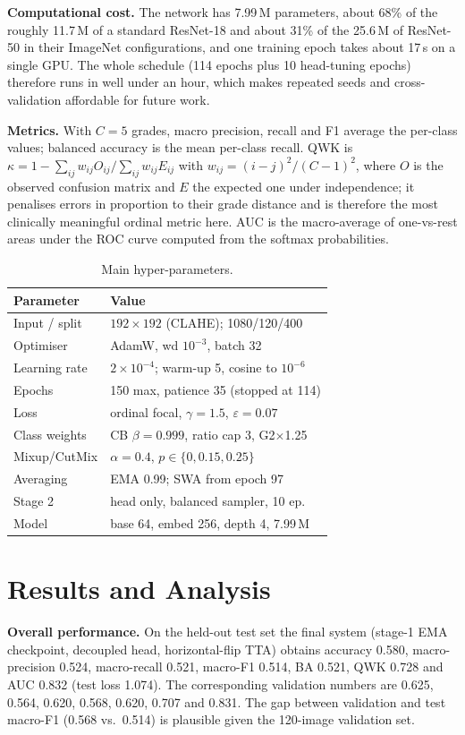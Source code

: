 \documentclass[10pt,twocolumn]{article}
\begin{document}
\textbf{Computational cost.} The network has 7.99\,M parameters, about 68\% of the roughly 11.7\,M of a standard ResNet-18 and about 31\% of the 25.6\,M of ResNet-50 in their ImageNet configurations, and one training epoch takes about 17\,s on a single GPU. The whole schedule (114 epochs plus 10 head-tuning epochs) therefore runs in well under an hour, which makes repeated seeds and cross-validation affordable for future work.

\textbf{Metrics.} With $C{=}5$ grades, macro precision, recall and F1 average the per-class values; balanced accuracy is the mean per-class recall. QWK is $\kappa=1-\sum_{ij}w_{ij}O_{ij}/\sum_{ij}w_{ij}E_{ij}$ with $w_{ij}=(i-j)^2/(C-1)^2$, where $O$ is the observed confusion matrix and $E$ the expected one under independence; it penalises errors in proportion to their grade distance and is therefore the most clinically meaningful ordinal metric here. AUC is the macro-average of one-vs-rest areas under the ROC curve computed from the softmax probabilities.

\begin{table}[t]
\centering\footnotesize
\caption{Main hyper-parameters.}\label{tab:hp}
\begin{tabular}{p{2.55cm}p{4.85cm}}
\toprule
Parameter & Value\\
\midrule
Input / split & $192{\times}192$ (CLAHE); 1080/120/400\\
Optimiser & AdamW, wd $10^{-3}$, batch 32\\
Learning rate & $2{\times}10^{-4}$; warm-up 5, cosine to $10^{-6}$\\
Epochs & 150 max, patience 35 (stopped at 114)\\
Loss & ordinal focal, $\gamma{=}1.5$, $\varepsilon{=}0.07$\\
Class weights & CB $\beta{=}0.999$, ratio cap 3, G2$\times$1.25\\
Mixup/CutMix & $\alpha{=}0.4$, $p\in\{0,0.15,0.25\}$\\
Averaging & EMA 0.99; SWA from epoch 97\\
Stage 2 & head only, balanced sampler, 10 ep.\\
Model & base 64, embed 256, depth 4, 7.99\,M\\
\bottomrule
\end{tabular}
\end{table}

\section{Results and Analysis}
\textbf{Overall performance.} On the held-out test set the final system (stage-1 EMA checkpoint, decoupled head, horizontal-flip TTA) obtains accuracy 0.580, macro-precision 0.524, macro-recall 0.521, macro-F1 0.514, BA 0.521, QWK 0.728 and AUC 0.832 (test loss 1.074). The corresponding validation numbers are 0.625, 0.564, 0.620, 0.568, 0.620, 0.707 and 0.831. The gap between validation and test macro-F1 (0.568 vs.\ 0.514) is plausible given the 120-image validation set.
\end{document}
